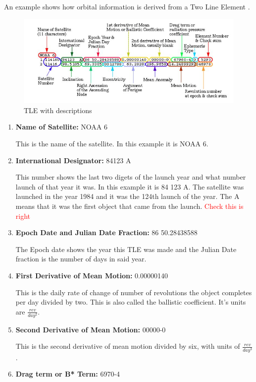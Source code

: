 \documentclass[12pt]{report}
\begin{document}
	An example shows how orbital information is derived from a Two Line Element \cite{NASATLE}.
	\begin{figure}[h!]
		\centering
		\includegraphics[width=0.7\linewidth]{tle_nasa}
		\caption{TLE with descriptions}
		\label{fig:tlenasa}
	\end{figure}
	
	\begin{enumerate}
		\item \textbf{Name of Satellite:} NOAA 6
		
		This is the name of the satellite. In this example it is NOAA 6.
		\item 	\textbf{International Designator:} 84123 A
		
		This number shows the last two digets of the launch year and what number launch of that year it was. In this example it is 84 123 A. The satellite was launched in the year 1984 and it was the 124th launch of the year. The A means that it was the first object that came from the launch. \textcolor{red}{Check this is right}
		
		\item \textbf{Epoch Date and Julian Date Fraction:} 86 50.28438588
		
		The Epoch date shows the year this TLE was made and the Julian Date fraction is the number of days in said year. 
		
		\item \textbf{First Derivative of Mean Motion:} 0.00000140
		
		This is the daily rate of change of number of revolutions the object completes per day divided by two. This is also called the ballistic coefficient.\cite{NASATLE} It's units are $\frac{rev}{day^2}$. 
		
		\item \textbf{Second Derivative of Mean Motion:} 00000-0
		
		This is the second derivative of mean motion divided by six, with units of $\frac{rev}{day^3}$.
		
		\item \textbf{Drag term or B* Term: }6970-4
		

\end{enumerate}
\end{document}
